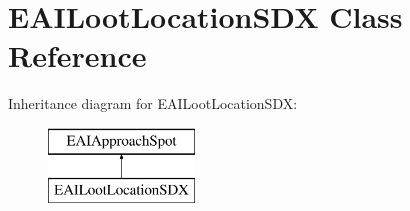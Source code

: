 \hypertarget{class_e_a_i_loot_location_s_d_x}{}\section{E\+A\+I\+Loot\+Location\+S\+DX Class Reference}
\label{class_e_a_i_loot_location_s_d_x}
Inheritance diagram for E\+A\+I\+Loot\+Location\+S\+DX\+:\begin{figure}[H]
\begin{center}
\leavevmode
\includegraphics[height=2.000000cm]{d0/d8c/class_e_a_i_loot_location_s_d_x}
\end{center}
\end{figure}
